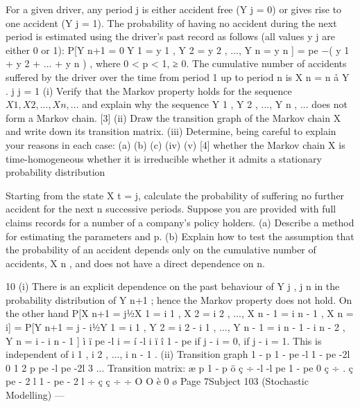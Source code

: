 For a given driver, any period j is either accident free (Y j = 0) or gives rise to one
accident (Y j = 1). The probability of having no accident during the next period is
estimated using the driver’s past record as follows (all values y j are either 0 or 1):
P[Y n+1 = 0Y 1 = y 1 , Y 2 = y 2 , ..., Y n = y n ] = pe −\lambda ( y 1 + y 2 + ... + y n ) ,
where 0 < p < 1, \lambda ≥ 0. The cumulative number of accidents suffered by the
driver over the time from period 1 up to period n is
X n =
n
å Y .
j
j = 1
(i) Verify that the Markov property holds for the sequence $X 1 , X 2 , ..., X n , ...$
and explain why the sequence Y 1 , Y 2 , ..., Y n , ... does not form a Markov
chain.
[3]
(ii) Draw the transition graph of the Markov chain X and write down its
transition matrix.
(iii) Determine, being careful to explain your reasons in each case:
(a)
(b)
(c)
(iv)
(v)
[4]
whether the Markov chain X is time-homogeneous
whether it is irreducible
whether it admits a stationary probability distribution 


Starting from the state X t = j, calculate the probability of suffering no
further accident for the next n successive periods. 
Suppose you are provided with full claims records for a number of a
company’s policy holders.
(a) Describe a method for estimating the parameters \lambda and p.
(b) Explain how to test the assumption that the probability of an accident depends only on the cumulative number of accidents, X n ,
and does not have a direct dependence on n.

\newpage

10
(i)
There is an explicit dependence on the past behaviour of Y j , j \leq n in the
probability distribution of Y n+1 ; hence the Markov property does not hold.
On the other hand
P[X n+1 = j1⁄2X 1 = i 1 , X 2 = i 2 , ..., X n - 1 = i n - 1 , X n = i]
= P[Y n+1 = j - i1⁄2Y 1 = i 1 , Y 2 = i 2 - i 1 , ..., Y n - 1 = i n - 1 - i n - 2 , Y n = i - i n - 1 ]
ì ï pe -l i
= í
-l i
ï
î 1 - pe
if j - i = 0,
if j - i = 1.
This is independent of i 1 , i 2 , ..., i n - 1 .
(ii)
Transition graph
1 - p
1 - pe -l
1 - pe -2l
0 1 2
p pe -l pe -2l
3
...
Transition matrix:
æ p 1 - p
ö
ç
÷
-l
-l
pe
1 - pe
0
ç
÷ .
ç
pe - 2 l
1 - pe - 2 l ÷
ç ç
÷ ÷
O
O
è 0
ø
Page 7Subject 103 (Stochastic Modelling) — 

